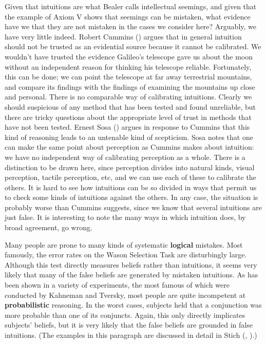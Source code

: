 \documentclass[
  11pt,
  letterpaper,
  DIV=11,
  numbers=noendperiod,
  oneside]{scrartcl}
\begin{document}
Given that intuitions are what Bealer calls intellectual seemings, and
given that the example of Axiom V shows that seemings can be mistaken,
what evidence have we that they are not mistaken in the cases we
consider here? Arguably, we have very little indeed. Robert Cummins
() argues that in general intuition
should not be trusted as an evidential source because it cannot be
calibrated. We wouldn't have trusted the evidence Galileo's telescope
gave us about the moon without an independent reason for thinking his
telescope reliable. Fortunately, this can be done; we can point the
telescope at far away terrestrial mountains, and compare its findings
with the findings of examining the mountains up close and personal.
There is no comparable way of calibrating intuitions. Clearly we should
suspicious of any method that has been tested and found unreliable, but
there are tricky questions about the appropriate level of trust in
methods that have not been tested. Ernest Sosa
() argues in response to Cummins that this
kind of reasoning leads to an untenable kind of scepticism. Sosa notes
that one can make the same point about perception as Cummins makes about
intuition: we have no independent way of calibrating perception as a
whole. There is a distinction to be drawn here, since perception divides
into natural kinds, visual perception, tactile perception, etc, and we
can use each of these to calibrate the others. It is hard to see how
intuitions can be so divided in ways that permit us to check some kinds
of intuitions against the others. In any case, the situation is probably
worse than Cummins suggests, since we know that several intuitions are
just false. It is interesting to note the many ways in which intuition
does, by broad agreement, go wrong.

Many people are prone to many kinds of systematic \textbf{logical}
mistakes. Most famously, the error rates on the Wason Selection Task are
disturbingly large. Although this test directly measures beliefs rather
than intuitions, it seems very likely that many of the false beliefs are
generated by mistaken intuitions. As has been shown in a variety of
experiments, the most famous of which were conducted by Kahneman and
Tversky, most people are quite incompetent at \textbf{probabilistic}
reasoning. In the worst cases, subjects held that a conjunction was more
probable than one of its conjuncts. Again, this only directly implicates
subjects' beliefs, but it is very likely that the false beliefs are
grounded in false intuitions. (The examples in this paragraph are
discussed in detail in Stich (,
).)
\end{document}
